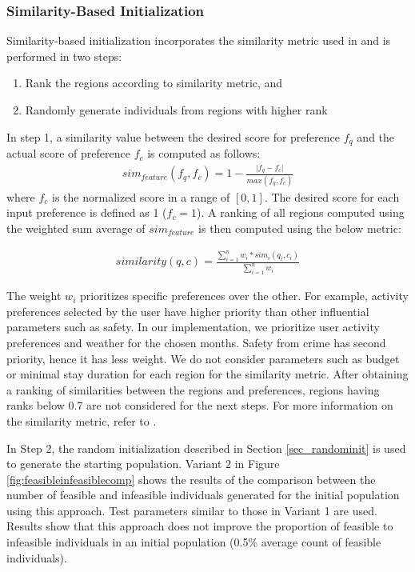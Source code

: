 \subsubsection{Similarity-Based Initialization}\label{sec_sim}
Similarity-based initialization incorporates the similarity metric used in \parencite{cbrecsys2014} and is performed in two steps:

\begin{enumerate}
    \item Rank the regions according to similarity metric, and
    \item Randomly generate individuals from regions with higher rank
\end{enumerate}
In step 1, a similarity value between the desired score for preference $f_q$ and the actual score of preference $f_c$ is computed as follows:
\begin{align*}
sim_{feature} (f_q, f_c) = 1 - \frac{\lvert f_q - f_c \rvert} {max(f_q , f_c)}
\end{align*}
where $f_c$ is the normalized score in a range of $[0,1]$. The desired score for each input preference is defined as 1 ($f_c=1$). A ranking of all regions computed using the weighted sum average of $sim_{feature}$ is then computed using the below metric:

\begin{align*}
similarity (q, c) = \frac{\sum_{i=1}^{n} w_i * sim_i(q_i, c_i)} {\sum_{i=1}^{n} w_i}
\end{align*}

The weight $w_i$ prioritizes specific preferences over the other. For example, activity preferences selected by the user have higher priority than other influential parameters such as safety. In our implementation, we prioritize user activity preferences and weather for the chosen months. Safety from crime has second priority, hence it has less weight. We do not consider parameters such as budget or minimal stay duration for each region for the similarity metric. After obtaining a ranking of similarities between the regions and preferences, regions having ranks below 0.7 are not considered for the next steps. For more information on the similarity metric, refer to \parencite{cbrecsys2014}.

In Step 2, the random initialization described in Section \ref{sec_randominit} is used to generate the starting population. Variant 2 in Figure \ref{fig:feasibleinfeasiblecomp} shows the results of the comparison between the number of feasible and infeasible individuals generated for the initial population using this approach. Test parameters similar to those in Variant 1 are used. Results show that this approach does not improve the proportion of feasible to infeasible individuals in an initial population (0.5\% average count of feasible individuals).

